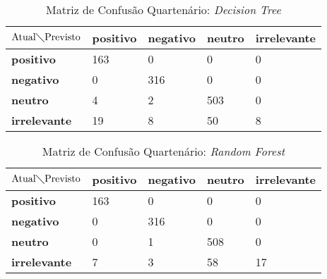 \begin{table}[h!]
\centering
\caption{Matriz de Confusão Quartenário: \textit{Decision Tree}}
\label{tab:mcq-nb}
\begin{tabular}{|l|l|l|l|l|}
\hline
$\textrm{Atual}\diagdown\textrm{Previsto}$ & \textbf{positivo} & \textbf{negativo} & \textbf{neutro} & \textbf{irrelevante}\\ \hline
\textbf{positivo} & 163 & 0 & 0 & 0\\ \hline
\textbf{negativo} & 0 & 316 & 0 & 0\\ \hline
\textbf{neutro} & 4 & 2 & 503 & 0 \\ \hline
\textbf{irrelevante} & 19 & 8 & 50 & 8 \\ \hline
\end{tabular}
\end{table}

\begin{table}[h!]
\centering
\caption{Matriz de Confusão Quartenário: \textit{Random Forest}}
\label{tab:mcq-rf}
\begin{tabular}{|l|l|l|l|l|}
\hline
$\textrm{Atual}\diagdown\textrm{Previsto}$ & \textbf{positivo} & \textbf{negativo} & \textbf{neutro} & \textbf{irrelevante}\\ \hline
\textbf{positivo} & 163 & 0 & 0 & 0\\ \hline
\textbf{negativo} & 0 & 316 & 0 & 0\\ \hline
\textbf{neutro} & 0 & 1 & 508 & 0 \\ \hline
\textbf{irrelevante} & 7 & 3 & 58 & 17 \\ \hline
\end{tabular}
\end{table}